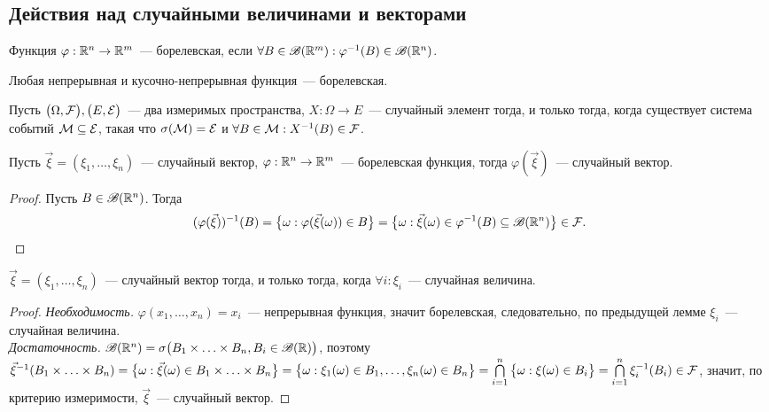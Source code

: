 \subsection{Действия над случайными величинами и векторами}
\begin{definition}
	Функция $\varphi: \mathbb{R}^n \rightarrow \mathbb{R}^m$~--- борелевская, если $\forall B \in \mathscr{B}(\mathbb{R}^m): \varphi^{-1}(B) \in \mathscr{B}(\mathbb{R}^n)$. 
\end{definition}
\begin{statement}
	Любая непрерывная и кусочно-непрерывная функция~--- борелевская.
\end{statement}
\begin{theorem}
	Пусть $\big(\Omega, \mathcal{F}\big), \big(E, \mathcal{E}\big)$~--- два измеримых пространства, $X: \Omega \rightarrow E$~--- случайный элемент тогда, и только тогда, когда существует система событий $\mathcal{M} \subseteq \mathcal{E}$, такая что $\sigma(\mathcal{M}) = \mathcal{E}$ и $\forall B \in \mathcal{M}: X^{-1}(B) \in \mathcal{F}$.
\end{theorem}
\begin{lemma}
	Пусть $\vec\xi = (\xi_1, \ldots, \xi_n)$~--- случайный вектор, $\varphi: \mathbb{R}^n \rightarrow \mathbb{R}^m$~--- борелевская функция, тогда $\varphi(\vec\xi)$~--- случайный вектор.
	\begin{proof}
		Пусть $B \in \mathscr{B}(\mathbb{R}^n)$. Тогда 
		$$ (\varphi(\vec\xi))^{-1}(B) = \big\{\omega : \varphi(\vec\xi(\omega)) \in B\big\} = \big\{\omega : \vec\xi(\omega) \in \varphi^{-1}(B) \subseteq \mathscr{B}(\mathbb{R}^n) \big\} \in \mathcal{F}. $$
	\end{proof}
\end{lemma}
\begin{lemma}
	$\vec \xi = (\xi_1, \ldots, \xi_n)$~--- случайный вектор тогда, и только тогда, когда $\forall i : \xi_i$~--- случайная величина.
	\begin{proof}
		\emph{Необходимость.} $\varphi(x_1, \ldots, x_n) = x_i$~--- непрерывная функция, значит борелевская, следовательно, по предыдущей лемме $\xi_i$~--- случайная величина. \\
		\emph{Достаточность.} $\mathscr{B}(\mathbb{R}^n) = \sigma\big(B_1 \times \ldots \times B_n, B_i \in \mathscr{B}(\mathbb{R})\big)$, поэтому $\vec\xi^{-1}(B_1 \times \ldots \times B_n) = \big\{\omega : \vec\xi(\omega) \in B_1 \times \ldots \times B_n\big\} = \big\{\omega : \xi_1(\omega) \in B_1, \ldots, \xi_n(\omega) \in B_n\big\} = \bigcap\limits_{i = 1}^n\big\{\omega: \xi(\omega) \in B_i \big\} = \bigcap\limits_{i = 1}^n \xi_i^{-1}(B_i) \in \mathcal{F}$, значит, по критерию измеримости, $\vec \xi$~--- случайный вектор.
	\end{proof}
\end{lemma}
